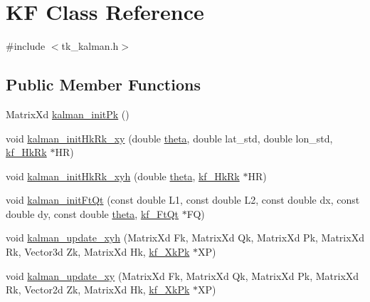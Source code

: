 \hypertarget{class_k_f}{\section{K\-F Class Reference}
\label{class_k_f}
}


{\ttfamily \#include $<$tk\-\_\-kalman.\-h$>$}

\subsection*{Public Member Functions}
\begin{DoxyCompactItemize}
\item 
Matrix\-Xd \hyperlink{class_k_f_a29381c41df77501e7a4682c7c77d3b8b}{kalman\-\_\-init\-Pk} ()
\item 
void \hyperlink{class_k_f_ad2bde0feaee5e3cc1738ef72fb6ab4ec}{kalman\-\_\-init\-Hk\-Rk\-\_\-xy} (double \hyperlink{tk__global_8cpp_af26b544e9eeda32659fb48228ac6b97f}{theta}, double lat\-\_\-std, double lon\-\_\-std, \hyperlink{structkf___hk_rk}{kf\-\_\-\-Hk\-Rk} $\ast$H\-R)
\item 
void \hyperlink{class_k_f_ad791d37b53fdf46959e88e9410360346}{kalman\-\_\-init\-Hk\-Rk\-\_\-xyh} (double \hyperlink{tk__global_8cpp_af26b544e9eeda32659fb48228ac6b97f}{theta}, \hyperlink{structkf___hk_rk}{kf\-\_\-\-Hk\-Rk} $\ast$H\-R)
\item 
void \hyperlink{class_k_f_a7b26242c45364995e91046e2aa764558}{kalman\-\_\-init\-Ft\-Qt} (const double L1, const double L2, const double dx, const double dy, const double \hyperlink{tk__global_8cpp_af26b544e9eeda32659fb48228ac6b97f}{theta}, \hyperlink{structkf___ft_qt}{kf\-\_\-\-Ft\-Qt} $\ast$F\-Q)
\item 
void \hyperlink{class_k_f_a0480cab0386f82cead11d9ab907c20df}{kalman\-\_\-update\-\_\-xyh} (Matrix\-Xd Fk, Matrix\-Xd Qk, Matrix\-Xd Pk, Matrix\-Xd Rk, Vector3d Zk, Matrix\-Xd Hk, \hyperlink{structkf___xk_pk}{kf\-\_\-\-Xk\-Pk} $\ast$X\-P)
\item 
void \hyperlink{class_k_f_ab9df303e9daa32209e15f7a324a1a2f8}{kalman\-\_\-update\-\_\-xy} (Matrix\-Xd Fk, Matrix\-Xd Qk, Matrix\-Xd Pk, Matrix\-Xd Rk, Vector2d Zk, Matrix\-Xd Hk, \hyperlink{structkf___xk_pk}{kf\-\_\-\-Xk\-Pk} $\ast$X\-P)
\end{DoxyCompactItemize}


